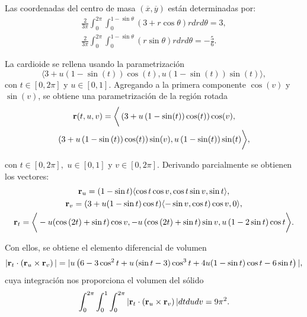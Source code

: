 Las coordenadas del centro de masa $(\overline{x},\overline{y})$ están determinadas por:
\begin{gather*}
\frac{2}{3\pi }\int_{0}^{2\pi }\int_{0}^{1-\sin \theta }\left( 3+r\cos \theta \right) rdrd\theta = 3,\\
\frac{2}{3\pi }\int_{0}^{2\pi }\int_{0}^{1-\sin \theta }\left( r\sin \theta \right) rdrd\theta = -\frac{5}{6}.
\end{gather*}


La cardioide se rellena usando la parametrización
\[\langle 3+u\left( 1-\sin (t) \right) \cos (t),u\left( 1-\sin (t) \right) \sin (t) \rangle,\]
con $t\in [0,2\pi]$ y $u\in [0,1]$.
Agregando a la primera componente $\cos(v)$ y $\sin(v)$, se obtiene una parametrización de la región rotada
\begin{multline*}
{\bf r}(t,u,v)=\bigg \langle\left ( 3+u\left( 1-\sin (t) \right) \cos (t) \right) \cos (v) , \\ \left( 3+u\left( 1-\sin \left(
t\right) \right) \cos (t) \right) \sin (v) ,u\left(1-\sin (t) \right) \sin (t) \bigg \rangle,
\end{multline*}

con $t\in [0,2\pi ],\,\, u\in [0,1]$ y $v\in [0,2\pi]$.
Derivando parcialmente se obtienen los vectores:
\begin{gather*}
{\bf r}_{u} = ( 1-\sin t) \langle \cos t\cos v, \cos t\sin v, \sin t\rangle, \\
{\bf r}_{v} = (3+u(1-\sin t) \cos t) \langle - \sin v,\cos t) \cos v,0\rangle, \\
{\bf r}_{t} = \bigg \langle -u( \cos \left( 2t\right) +\sin t) \cos v,-u\left( \cos \left( 2t\right) +\sin t\right) \sin v, u\left( 1-2\sin t\right) \cos t \bigg \rangle.
\end{gather*}

Con ellos, se obtiene el elemento diferencial de volumen
\begin{gather*}
|{\bf r}_{t}\cdot \left( {\bf r}_{u}\times {\bf r}_{v}\right)| = |u\left( 6-3\cos ^{2}t+u\left(\sin t-3\right) \cos ^{3}t+4u(1-\sin t)\cos t-6\sin t\right)|,
\end{gather*}
cuya integración nos proporciona el volumen del sólido
\[\int_{0}^{2\pi }\int_{0}^{1}\int_{0}^{2\pi} |{\bf r}_{t}\cdot \left( {\bf r}_{u}\times {\bf r}_{v}\right)|
dtdudv= 9\pi ^{2}.\]

